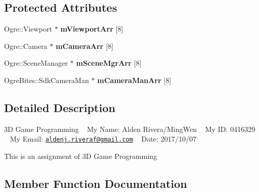 \subsection*{Protected Attributes}
\begin{DoxyCompactItemize}
\item 
\mbox{\label{class_basic_tutorial__00_a6676a92b50e9b43634d4c66488537b73}} 
Ogre\+::\+Viewport $\ast$ {\bfseries m\+Viewport\+Arr} \mbox{[}8\mbox{]}
\item 
\mbox{\label{class_basic_tutorial__00_af8d457d912286a98c0975c52d4faf910}} 
Ogre\+::\+Camera $\ast$ {\bfseries m\+Camera\+Arr} \mbox{[}8\mbox{]}
\item 
\mbox{\label{class_basic_tutorial__00_a603779b6087698c57b7989e16d8a9b93}} 
Ogre\+::\+Scene\+Manager $\ast$ {\bfseries m\+Scene\+Mgr\+Arr} \mbox{[}8\mbox{]}
\item 
\mbox{\label{class_basic_tutorial__00_a700c07f924c71e9fa1885a46f599d934}} 
Ogre\+Bites\+::\+Sdk\+Camera\+Man $\ast$ {\bfseries m\+Camera\+Man\+Arr} \mbox{[}8\mbox{]}
\end{DoxyCompactItemize}


\subsection{Detailed Description}
3D Game Programming ~\newline
My Name\+: Alden Rivera/\+Ming\+Wen ~\newline
My ID\+: 0416329 ~\newline
My Email\+: \href{mailto:aldenj.riveraf@gmail.com}{\tt aldenj.\+riveraf@gmail.\+com} ~\newline
 Date\+: 2017/10/07 

This is an assignment of 3D Game Programming 

\subsection{Member Function Documentation}
\mbox{\label{class_basic_tutorial__00_aba97a29d983586d2dc8e108d3bccf721}} 
